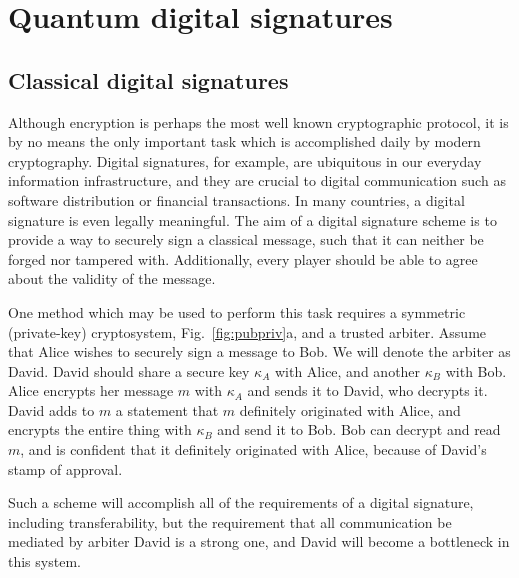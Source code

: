 \section{Quantum digital signatures}\label{sec:lit_review_qds}


\subsection{Classical digital signatures}

Although encryption is perhaps the most well known cryptographic protocol, it is by no means the only important task which is accomplished daily by modern cryptography. Digital signatures, for example, are ubiquitous in our everyday information infrastructure, and they are crucial to digital communication such as software distribution or financial transactions. In many countries, a digital signature is even legally meaningful. The aim of a digital signature scheme is to provide a way to securely sign a classical message, such that it can neither be forged nor tampered with. Additionally, every player should be able to agree about the validity of the message. 

One method which may be used to perform this task requires a symmetric (private-key) cryptosystem, Fig.~\ref{fig:pubpriv}a, and a trusted arbiter. Assume that Alice wishes to securely sign a message to Bob. We will denote the arbiter as David. David should share a secure key $\kappa_A$ with Alice, and another $\kappa_B$ with Bob. Alice encrypts her message $m$ with $\kappa_A$ and sends it to David, who decrypts it. David adds to $m$ a statement that $m$ definitely originated with Alice, and encrypts the entire thing with $\kappa_B$ and send it to Bob. Bob can decrypt and read $m$, and is confident that it definitely originated with Alice, because of David's stamp of approval.

Such a scheme will accomplish all of the requirements of a digital signature, including transferability, but the requirement that all communication be mediated by arbiter David is a strong one, and David will become a bottleneck in this system.

